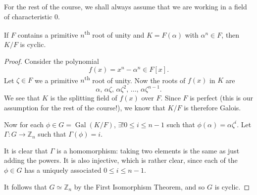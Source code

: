 \documentclass[notoc,notitlepage,nobib]{tufte-book}
\DeclareMathOperator{\Gal}{Gal}
\begin{document}
\begin{note}
  For the rest of the course, we shall always assume that we are working in a
  field of characteristic 0.
\end{note}

\begin{propo}\label{propo:simple_primitive_extensions_are_cyclic}
  If $F$ contains a primitive $n$\textsuperscript{th} root of unity and $K =
  F(\alpha)$ with $\alpha^n \in F$, then $K / F$ is cyclic.
\end{propo}

\begin{proof}
  Consider the polynomial
  \begin{equation*}
    f(x) = x^n - \alpha^n \in F[x].
  \end{equation*}
  Let $\zeta \in F$ we a primitive $n$\textsuperscript{th} root of unity. Now
  the roots of $f(x)$ in $K$ are
  \begin{equation*}
    \alpha,\,\alpha\zeta,\,\alpha\zeta^2,\,\ldots,\,\alpha\zeta^{n-1}.
  \end{equation*}
  We see that $K$ is the splitting field of $f(x)$ over $F$. Since $F$ is
  perfect (this is our assumption for the rest of the course!), we know that $K
  / F$ is therefore Galois.

  Now for each $\phi \in G = \Gal(K / F)$, $\exists! 0 \leq i \leq n-1$ such
  that $\phi(\alpha) = \alpha\zeta^i$. Let $\Gamma : G \to \mathbb{Z}_n$ such
  that $\Gamma(\phi) = i$.

  It is clear that $\Gamma$ is a homomorphism: taking two elements is the same
  as just adding the powers. It is also injective, which is rather clear, since
  each of the $\phi \in G$ has a uniquely associated $0 \leq i \leq n-1$.

  It follows that $G \simeq \mathbb{Z}_n$ by the First Isomorphism Theorem, and
  so $G$ is cyclic.
\end{proof}
\end{document}
